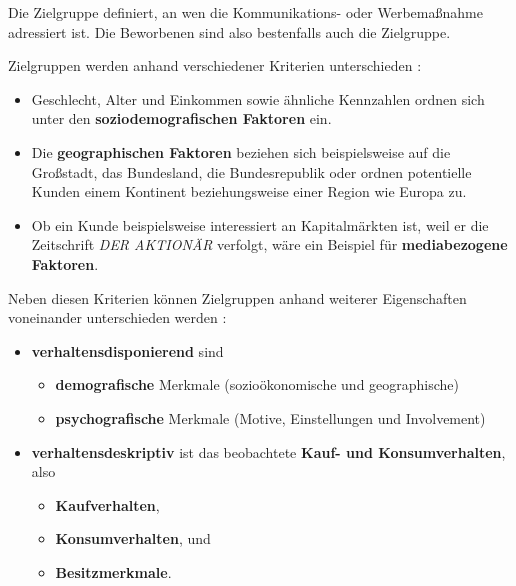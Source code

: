 Die Zielgruppe definiert, an wen die Kommunikations- oder Werbemaßnahme adressiert ist. Die Beworbenen sind also bestenfalls auch die Zielgruppe. \cite[S. 6 f.]{002_MKO03_communication-communication-goals-and-advertising-conception}

Zielgruppen werden anhand verschiedener Kriterien unterschieden \cite[S. 20 ff.]{002_MKO03_communication-communication-goals-and-advertising-conception}:

\begin{itemize}
    \item Geschlecht, Alter und Einkommen sowie ähnliche Kennzahlen ordnen sich unter den \textbf{soziodemografischen Faktoren} ein.
    \item Die \textbf{geographischen Faktoren} beziehen sich beispielsweise auf die Großstadt, das Bundesland, die Bundesrepublik oder ordnen potentielle Kunden einem Kontinent beziehungsweise einer Region wie Europa zu.
    \item Ob ein Kunde beispielsweise interessiert an Kapitalmärkten ist, weil er die Zeitschrift \textit{DER AKTIONÄR} verfolgt, wäre ein Beispiel für \textbf{mediabezogene Faktoren}.
\end{itemize}


Neben diesen Kriterien können Zielgruppen anhand weiterer Eigenschaften voneinander unterschieden werden \cite[S. 23]{002_MKO03_communication-communication-goals-and-advertising-conception}:

\begin{itemize}
    \item \textbf{verhaltensdisponierend} sind
    \begin{itemize}
        \item \textbf{demografische} Merkmale (sozioökonomische und geographische)
        \item \textbf{psychografische} Merkmale (Motive, Einstellungen und Involvement)
    \end{itemize}
    \item \textbf{verhaltensdeskriptiv} ist das beobachtete \textbf{Kauf- und Konsumverhalten}, also
    \begin{itemize}
        \item \textbf{Kaufverhalten},
        \item \textbf{Konsumverhalten}, und
        \item \textbf{Besitzmerkmale}.
    \end{itemize}
\end{itemize}

